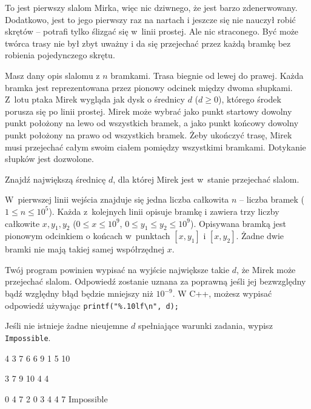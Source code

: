

\usepackage[utf8]{inputenc}
\usepackage[T1]{fontenc}
\usepackage[polish]{babel}
\usepackage{polski}





To jest pierwszy slalom Mirka, więc nic dziwnego, że jest barzo zdenerwowany.
Dodatkowo, jest to jego pierwszy raz na nartach
	i jeszcze się nie nauczył robić skrętów -- potrafi tylko ślizgać się w~linii prostej.
Ale nic straconego.
Być może twórca trasy nie był zbyt uważny i da się przejechać przez każdą bramkę bez robienia pojedynczego skrętu.


Masz dany opis slalomu z $n$ bramkami.
Trasa biegnie od lewej do prawej.
Każda bramka jest reprezentowana przez pionowy odcinek między dwoma słupkami.
Z~lotu ptaka Mirek wygląda jak dysk o średnicy $d$ ($d \geq 0$), którego środek porusza się po linii prostej.
Mirek może wybrać jako punkt startowy dowolny punkt położony na lewo od wszystkich bramek,
	a jako punkt końcowy dowolny punkt położony na prawo od wszystkich bramek.
Żeby ukończyć trasę, Mirek musi przejechać całym swoim ciałem pomiędzy wszystkimi bramkami.
Dotykanie słupków jest dozwolone. 

Znajdź największą średnicę $d$, dla której Mirek jest w~stanie przejechać slalom.


W~pierwszej linii wejścia znajduje się jedna liczba całkowita $n$ -- liczba bramek
	($1 \leq n \leq 10^5$).
Każda z~kolejnych linii opisuje bramkę i zawiera trzy liczby całkowite $x, y_1, y_2$
	($0 \leq x \leq 10^9$, $0 \leq y_1 \leq y_2 \leq 10^9$).
Opisywana bramką jest pionowym odcinkiem o końcach w~punktach $[x, y_1]$ i $[x, y_2]$.
Żadne dwie bramki nie mają takiej samej współrzędnej $x$.


Twój program powinien wypisać na wyjście największe takie $d$, że Mirek może przejechać slalom.
Odpowiedź zostanie uznana za poprawną jeśli jej bezwzględny bądź względny błąd będzie mniejszy niż $10^{-9}$.
W C++, możesz wypisać odpowiedź używając \verb!printf("%.10lf\n", d);!

Jeśli nie istnieje żadne nieujemne $d$ spełniające warunki zadania, wypisz \texttt{Impossible}.


4 3 7
6 6 9
1 5 10
\sampleEND

3 7 9
10 4 4
\sampleEND

0 4 7
2 0 3
4 4 7
\sampleOUT
Impossible
\sampleEND



